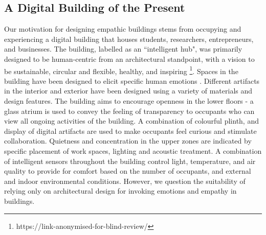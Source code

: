 \documentclass [sigconf, review, anonymous] {acmart}
\begin{document}
\subsection{A Digital Building of the Present}
\label{subsec:building}
Our motivation for designing empathic buildings stems from occupying and experiencing a digital building that houses students, researchers, entrepreneurs, and businesses. The building, labelled as an ``intelligent hub", was primarily designed to be human-centric from an architectural standpoint, with a vision to be sustainable, circular and flexible, healthy, and inspiring \footnote{https://link-anonymised-for-blind-review/}. Spaces in the building have been designed to elicit specific human emotions \cite{silo_michiel_2022}. Different artifacts in the interior and exterior have been designed using a variety of materials and design features. The building aims to encourage openness in the lower floors - a glass atrium is used to convey the feeling of transparency to occupants who can view all ongoing activities of the building. A combination of colourful plinth, and display of digital artifacts are used to make occupants feel curious and stimulate collaboration. Quietness and concentration in the upper zones are indicated by specific placement of work spaces, lighting and acoustic treatment. A combination of intelligent sensors throughout the building control light, temperature, and air quality to provide for comfort based on the number of occupants, and external and indoor environmental conditions. However, we question the suitability of relying only on architectural design for invoking emotions and empathy in buildings. 
\end{document}
